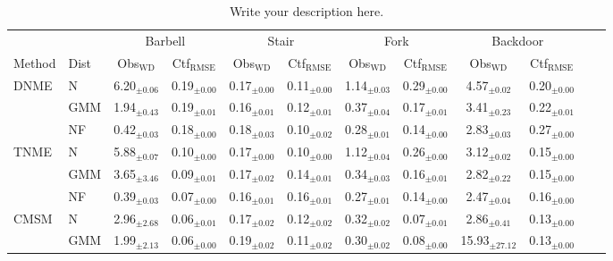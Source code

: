 
\begin{table}[t]
\caption{Write your description here.}
\label{sample-table}
\vskip 0.15in
\begin{center}
\begin{small}
\begin{sc}
\begin{tabular}{llcccccccccc}
\toprule
 &  & \multicolumn{2}{c}{Barbell} & \multicolumn{2}{c}{Stair} & \multicolumn{2}{c}{Fork} & \multicolumn{2}{c}{Backdoor} \\
      \cmidrule(lr){3-4}                \cmidrule(lr){5-6}              \cmidrule(lr){7-8}             \cmidrule(lr){9-10}
Method & Dist & Obs$_{\text{WD}}$ & Ctf$_{\text{RMSE}}$ & Obs$_{\text{WD}}$ & Ctf$_{\text{RMSE}}$ & Obs$_{\text{WD}}$ & Ctf$_{\text{RMSE}}$ & Obs$_{\text{WD}}$ & Ctf$_{\text{RMSE}}$ \\
\midrule
\multirow{3}{*}{DNME} & N   & 6.20$_{\pm 0.06}$ & 0.19$_{\pm 0.00}$ & 0.17$_{\pm 0.00}$ & 0.11$_{\pm 0.00}$ & 1.14$_{\pm 0.03}$ & 0.29$_{\pm 0.00}$ & 4.57$_{\pm 0.02}$ & 0.20$_{\pm 0.00}$ \\
                             & GMM & 1.94$_{\pm 0.43}$ & 0.19$_{\pm 0.01}$ & 0.16$_{\pm 0.01}$ & 0.12$_{\pm 0.01}$ & 0.37$_{\pm 0.04}$ & 0.17$_{\pm 0.01}$ & 3.41$_{\pm 0.23}$ & 0.22$_{\pm 0.01}$ \\
                             & NF  & 0.42$_{\pm 0.03}$ & 0.18$_{\pm 0.00}$ & 0.18$_{\pm 0.03}$ & 0.10$_{\pm 0.02}$ & 0.28$_{\pm 0.01}$ & 0.14$_{\pm 0.00}$ & 2.83$_{\pm 0.03}$ & 0.27$_{\pm 0.00}$ \\
\midrule
\multirow{3}{*}{TNME} & N   & 5.88$_{\pm 0.07}$ & 0.10$_{\pm 0.00}$ & 0.17$_{\pm 0.00}$ & 0.10$_{\pm 0.00}$ & 1.12$_{\pm 0.04}$ & 0.26$_{\pm 0.00}$ & 3.12$_{\pm 0.02}$ & 0.15$_{\pm 0.00}$ \\
                             & GMM & 3.65$_{\pm 3.46}$ & 0.09$_{\pm 0.01}$ & 0.17$_{\pm 0.02}$ & 0.14$_{\pm 0.01}$ & 0.34$_{\pm 0.03}$ & 0.16$_{\pm 0.01}$ & 2.82$_{\pm 0.22}$ & 0.15$_{\pm 0.00}$ \\
                             & NF  & 0.39$_{\pm 0.03}$ & 0.07$_{\pm 0.00}$ & 0.16$_{\pm 0.01}$ & 0.16$_{\pm 0.01}$ & 0.27$_{\pm 0.01}$ & 0.14$_{\pm 0.00}$ & 2.47$_{\pm 0.04}$ & 0.16$_{\pm 0.00}$ \\
\midrule
\multirow{3}{*}{CMSM} & N   & 2.96$_{\pm 2.68}$ & 0.06$_{\pm 0.01}$ & 0.17$_{\pm 0.02}$ & 0.12$_{\pm 0.02}$ & 0.32$_{\pm 0.02}$ & 0.07$_{\pm 0.01}$ & 2.86$_{\pm 0.41}$ & 0.13$_{\pm 0.00}$ \\
                             & GMM & 1.99$_{\pm 2.13}$ & 0.06$_{\pm 0.00}$ & 0.19$_{\pm 0.02}$ & 0.11$_{\pm 0.02}$ & 0.30$_{\pm 0.02}$ & 0.08$_{\pm 0.00}$ & 15.93$_{\pm 27.12}$ & 0.13$_{\pm 0.00}$ \\

\end{tabular}
\end{sc}
\end{small}
\end{center}
\end{table}
